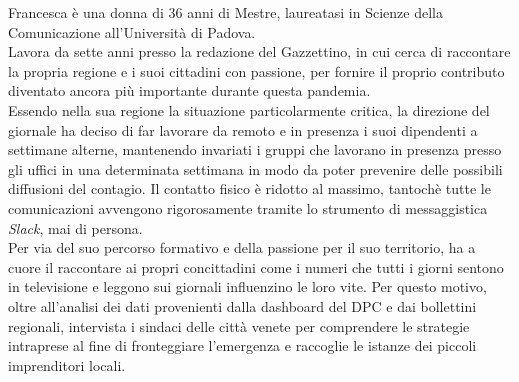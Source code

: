 Francesca è una donna di 36 anni di Mestre, laureatasi in Scienze della Comunicazione all'Università di Padova.\\ 
Lavora da sette anni presso la redazione del Gazzettino, in cui cerca di raccontare la propria regione e i suoi cittadini con passione, per fornire il proprio contributo diventato ancora più importante durante questa pandemia.\\ 
Essendo nella sua regione la situazione particolarmente critica, la direzione del giornale ha deciso di far lavorare da remoto e in presenza i suoi dipendenti a settimane alterne, mantenendo invariati i gruppi che lavorano in presenza presso gli uffici in una determinata settimana in modo da poter prevenire delle possibili diffusioni del contagio. Il contatto fisico è ridotto al massimo, tantochè tutte le comunicazioni avvengono rigorosamente tramite lo strumento di messaggistica \textit{Slack}, mai di persona.\\ 
Per via del suo percorso formativo e della passione per il suo territorio, ha a cuore il raccontare ai propri concittadini come i numeri che tutti i giorni sentono in televisione e leggono sui giornali influenzino le loro vite. Per questo motivo, oltre all'analisi dei dati provenienti dalla dashboard del DPC e dai bollettini regionali, intervista i sindaci delle città venete per comprendere le strategie intraprese al fine di fronteggiare l'emergenza e raccoglie le istanze dei piccoli imprenditori locali.

